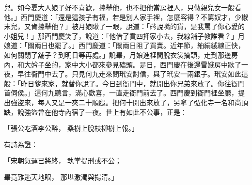 \begin{showcontents}{}
兒。如今夏大人娘子好不喜歡，擡舉他，也不把他當房裡人，只做親兒女一般看他。」西門慶道：「還是這孩子有福，若是別人家手裡，怎麼容得？不罵奴才，少椒末兒，又肯擡舉他？」被月娘瞅了一眼，說道：「硶說嘴的貨，是我罵了你心愛的小姐兒！」那西門慶笑了，說道：「他借了賁四押家小去，我線舖子教誰看？」月娘道：「關兩日也罷了。」西門慶道：「關兩日阻了買賣。近年節，紬絹絨線正快，如何關閉了舖子？到明日等再處。」說畢，月娘進裡間脫衣裳摘頭，走到那邊房內，和大妗子坐的，家中大小都來參見磕頭。是日，西門慶在後邊雪娥房中歇了一夜，早往衙門中去了。只見何九走來問玳安討信，與了玳安一兩銀子。玳安如此這般：「昨日爹來家，就替你說了。今日到衙門中，就開出你兄弟來放了。你往衙門首伺侯。」這何九聽言，滿心歡喜，一直走衙門前去了。西門慶到衙門裡坐廳，提出強盜來，每人又是一夾二十順腿。把何十開出來放了，另拿了弘化寺一名和尚頂缺，說強盜曾在他寺內宿了一夜。世上有如此不公事，正是：

「張公吃酒李公醉，  桑樹上脫枝柳樹上報。」

有詩為證：

「宋朝氣運已將終，  執掌提刑或不公；

畢竟難逃天地眼，  那堪激濁與揚清。」


\end{showcontents}

